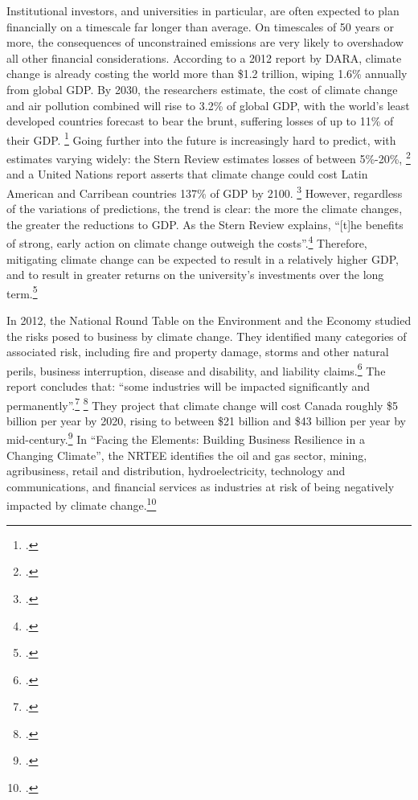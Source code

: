 Institutional investors, and universities in particular, are often expected to plan financially on a timescale far longer than average. 
On timescales of 50 years or more, the consequences of unconstrained emissions are very likely to overshadow all other financial considerations.
According to a 2012 report by DARA, climate change is already costing the world more than \$1.2 trillion, wiping 1.6\% annually from global GDP.
By 2030, the researchers estimate, the cost of climate change and air pollution combined will rise to 3.2\% of global GDP, with the world's least developed countries forecast to bear the brunt, suffering losses of up to 11\% of their GDP. \footcite{DARACVM}
Going further into the future is increasingly hard to predict, with estimates varying widely: the Stern Review estimates losses of between 5\%-20\%, \footcite{Stern2007} and a United Nations report asserts that climate change could cost Latin American and Carribean countries 137\% of GDP by 2100. \footcite{CCLatinAmerica}
However, regardless of the variations of predictions, the trend is clear: the more the climate changes, the greater the reductions to GDP.
As the Stern Review explains, ``[t]he benefits of strong, early action on climate change outweigh the costs''.\footcite[][Executive summary at: \url{http://www.hm-treasury.gov.uk/d/Executive_Summary.pdf}]{Stern2007}
Therefore, mitigating climate change can be expected to result in a relatively higher GDP, and to result in greater returns on the university's investments over the long term.\footcite[See also: ][]{EconomicCase}



In 2012, the National Round Table on the Environment and the Economy studied the risks posed to business by climate change.
They identified many categories of associated risk, including fire and property damage, storms and other natural perils, business interruption, disease and disability, and liability claims.\footcite[][p. 3]{ManagingBusinessRisks}
The report concludes that: ``some industries will be impacted significantly and permanently''.\footcite[][p. 2]{ManagingBusinessRisks} \footcite[See also: ][]{LeveragingInvestmentsCScience}
They project that climate change will cost Canada roughly \$5 billion per year by 2020, rising to between \$21 billion and \$43 billion per year by mid-century.\footcite[][p. 2]{ManagingBusinessRisks}
In ``Facing the Elements: Building Business Resilience in a Changing Climate'', the NRTEE identifies the oil and gas sector, mining, agribusiness, retail and distribution, hydroelectricity, technology and communications, and financial services as industries at risk of being negatively impacted by climate change.\footcite[][p. 9--10]{FacingTheElements}




